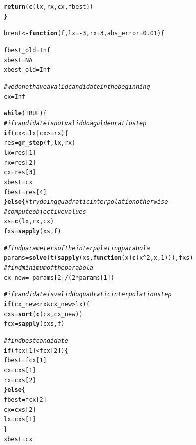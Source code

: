 \documentclass[a4paper]{article}
\makeatletter
\newcommand{\hlnum}[1]{\textcolor[rgb]{0.686,0.059,0.569}{#1}}%
\newcommand{\hlcom}[1]{\textcolor[rgb]{0.678,0.584,0.686}{\textit{#1}}}%
\newcommand{\hlopt}[1]{\textcolor[rgb]{0,0,0}{#1}}%
\newcommand{\hlstd}[1]{\textcolor[rgb]{0.345,0.345,0.345}{#1}}%
\newcommand{\hlkwa}[1]{\textcolor[rgb]{0.161,0.373,0.58}{\textbf{#1}}}%
\newcommand{\hlkwb}[1]{\textcolor[rgb]{0.69,0.353,0.396}{#1}}%
\newcommand{\hlkwc}[1]{\textcolor[rgb]{0.333,0.667,0.333}{#1}}%
\newcommand{\hlkwd}[1]{\textcolor[rgb]{0.737,0.353,0.396}{\textbf{#1}}}%
\newenvironment{kframe}{%
 \def\at@end@of@kframe{}%
 \ifinner\ifhmode%
  \def\at@end@of@kframe{\end{minipage}}%
  \begin{minipage}{\columnwidth}%
 \fi\fi%
 \def\FrameCommand##1{\hskip\@totalleftmargin \hskip-\fboxsep
 \colorbox{shadecolor}{##1}\hskip-\fboxsep
     \hskip-\linewidth \hskip-\@totalleftmargin \hskip\columnwidth}%
 \MakeFramed {\advance\hsize-\width
   \@totalleftmargin\z@ \linewidth\hsize
   \@setminipage}}%
 {\par\unskip\endMakeFramed%
 \at@end@of@kframe}
\newenvironment{knitrout}{}{} %
\makeatother
\begin{document}
{\begin{enumerate}
\begin{knitrout}
\begin{kframe}
\begin{alltt}
  \hlkwd{return}\hlstd{(}\hlkwd{c}\hlstd{(lx, rx, cx, fbest))}
\hlstd{\}}

\hlstd{brent} \hlkwb{<-} \hlkwa{function}\hlstd{(}\hlkwc{f}\hlstd{,} \hlkwc{lx} \hlstd{=} \hlopt{-}\hlnum{3}\hlstd{,} \hlkwc{rx} \hlstd{=} \hlnum{3}\hlstd{,} \hlkwc{abs_error} \hlstd{=} \hlnum{0.01}\hlstd{)\{}

  \hlstd{fbest_old} \hlkwb{=} \hlnum{Inf}
  \hlstd{xbest} \hlkwb{=} \hlnum{NA}
  \hlstd{xbest_old} \hlkwb{=} \hlnum{Inf}

  \hlcom{# we do not have a valid candidate in the beginning}
  \hlstd{cx} \hlkwb{=} \hlnum{Inf}

  \hlkwa{while}\hlstd{(}\hlnum{TRUE}\hlstd{)\{}
    \hlcom{# if candidate is not valid do a golden ratio step}
    \hlkwa{if}\hlstd{(cx} \hlopt{<=} \hlstd{lx} \hlopt{|} \hlstd{cx} \hlopt{>=} \hlstd{rx)\{}
      \hlstd{res} \hlkwb{=} \hlkwd{gr_step}\hlstd{(f, lx, rx)}
      \hlstd{lx} \hlkwb{=} \hlstd{res[}\hlnum{1}\hlstd{]}
      \hlstd{rx} \hlkwb{=} \hlstd{res[}\hlnum{2}\hlstd{]}
      \hlstd{cx} \hlkwb{=} \hlstd{res[}\hlnum{3}\hlstd{]}
      \hlstd{xbest} \hlkwb{=} \hlstd{cx}
      \hlstd{fbest} \hlkwb{=} \hlstd{res[}\hlnum{4}\hlstd{]}
    \hlstd{\}}\hlkwa{else}\hlstd{\{} \hlcom{# try doing quadratic interpolation otherwise}
      \hlcom{# compute objective values}
      \hlstd{xs} \hlkwb{=} \hlkwd{c}\hlstd{(lx, rx, cx)}
      \hlstd{fxs} \hlkwb{=} \hlkwd{sapply}\hlstd{(xs, f)}

      \hlcom{# find parameters of the interpolating parabola}
      \hlstd{params} \hlkwb{=} \hlkwd{solve}\hlstd{(}\hlkwd{t}\hlstd{(}\hlkwd{sapply}\hlstd{(xs,} \hlkwa{function}\hlstd{(}\hlkwc{x}\hlstd{)} \hlkwd{c}\hlstd{(x}\hlopt{^}\hlnum{2}\hlstd{, x,} \hlnum{1}\hlstd{))), fxs)}
      \hlcom{# find minimum of the parabola}
      \hlstd{cx_new} \hlkwb{=} \hlopt{-}\hlstd{params[}\hlnum{2}\hlstd{]}\hlopt{/}\hlstd{(}\hlnum{2}\hlopt{*}\hlstd{params[}\hlnum{1}\hlstd{])}

      \hlcom{# if candidate is valid do quadratic interpolation step}
      \hlkwa{if}\hlstd{(cx_new} \hlopt{<} \hlstd{rx} \hlopt{&} \hlstd{cx_new} \hlopt{>} \hlstd{lx)\{}
        \hlstd{cxs} \hlkwb{=} \hlkwd{sort}\hlstd{(}\hlkwd{c}\hlstd{(cx, cx_new))}
        \hlstd{fcx} \hlkwb{=} \hlkwd{sapply}\hlstd{(cxs, f)}

        \hlcom{# find best candidate}
        \hlkwa{if} \hlstd{(fcx[}\hlnum{1}\hlstd{]} \hlopt{<} \hlstd{fcx[}\hlnum{2}\hlstd{])\{}
          \hlstd{fbest} \hlkwb{=} \hlstd{fcx[}\hlnum{1}\hlstd{]}
          \hlstd{cx} \hlkwb{=} \hlstd{cxs[}\hlnum{1}\hlstd{]}
          \hlstd{rx} \hlkwb{=} \hlstd{cxs[}\hlnum{2}\hlstd{]}
        \hlstd{\}}\hlkwa{else}\hlstd{\{}
          \hlstd{fbest} \hlkwb{=} \hlstd{fcx[}\hlnum{2}\hlstd{]}
          \hlstd{cx} \hlkwb{=} \hlstd{cxs[}\hlnum{2}\hlstd{]}
          \hlstd{lx} \hlkwb{=} \hlstd{cxs[}\hlnum{1}\hlstd{]}
        \hlstd{\}}
        \hlstd{xbest} \hlkwb{=} \hlstd{cx}


\end{alltt}
\end{kframe}
\end{knitrout}
\end{enumerate}}
\end{document}
